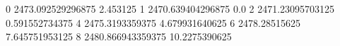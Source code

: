 0 2473.092529296875 2.453125
1 2470.639404296875 0.0
2 2471.23095703125 0.591552734375
4 2475.3193359375 4.679931640625
6 2478.28515625 7.645751953125
8 2480.866943359375 10.2275390625
